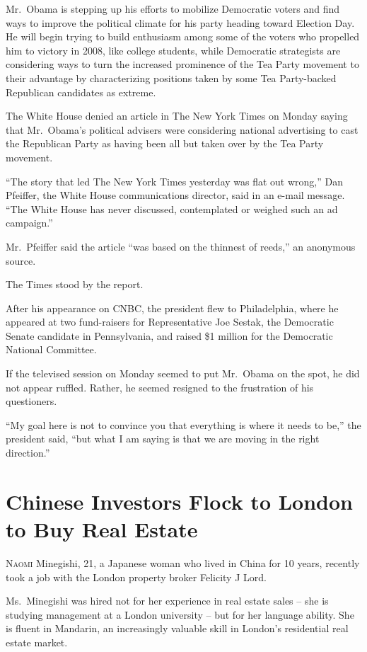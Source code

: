﻿\documentclass[12pt]{article}
\begin{document}
Mr.~Obama is stepping up his efforts to mobilize Democratic voters and find ways to improve the
political climate for his party heading toward Election Day. He will begin trying to build
enthusiasm among some of the voters who propelled him to victory in 2008, like college students,
while Democratic strategists are considering ways to turn the increased prominence of the Tea Party
movement to their advantage by characterizing positions taken by some Tea Party-backed Republican
candidates as extreme.

The White House denied an article in The New York Times on Monday saying that Mr.~Obama's political
advisers were considering national advertising to cast the Republican Party as having been all but
taken over by the Tea Party movement.

``The story that led The New York Times yesterday was flat out wrong,'' Dan Pfeiffer, the White
House communications director, said in an e-mail message. ``The White House has never discussed,
contemplated or weighed such an ad campaign.''

Mr.~Pfeiffer said the article ``was based on the thinnest of reeds,'' an anonymous source.

The Times stood by the report.

After his appearance on CNBC, the president flew to Philadelphia, where he appeared at two
fund-raisers for Representative Joe Sestak, the Democratic Senate candidate in Pennsylvania, and
raised \$1 million for the Democratic National Committee.

If the televised session on Monday seemed to put Mr.~Obama on the spot, he did not appear ruffled.
Rather, he seemed resigned to the frustration of his questioners.

``My goal here is not to convince you that everything is where it needs to be,'' the president said,
``but what I am saying is that we are moving in the right direction.''

\pagebreak
\section{Chinese Investors Flock to London to Buy Real Estate}

\lettrine{N}{aomi} Minegishi, 21, a Japanese woman who lived in China for
10 years, recently took a job with the London property broker Felicity J Lord.

Ms.~Minegishi was hired not for her experience in real estate sales -- she is studying management at
a London university -- but for her language ability. She is fluent in Mandarin, an increasingly
valuable skill in London's residential real estate market.
\end{document}
